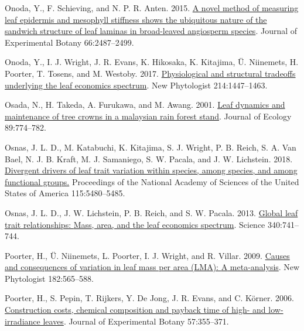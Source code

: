 \documentclass[
  12pt,
  a4paper,
,tablecaptionabove
]{scrartcl}
\newlength{\cslhangindent}
\newenvironment{CSLReferences}[2] %
 {%
  \setlength{\parindent}{0pt}
  \ifodd #1 \everypar{\setlength{\hangindent}{\cslhangindent}}\ignorespaces\fi
  \ifnum #2 > 0
  \setlength{\parskip}{#2\baselineskip}
  \fi
 }%
 {}
\begin{document}
\begin{CSLReferences}{1}{0}
\leavevmode{}%
Onoda, Y., F. Schieving, and N. P. R. Anten. 2015.
\href{https://doi.org/10.1093/jxb/erv024}{A novel method of measuring
leaf epidermis and mesophyll stiffness shows the ubiquitous nature of
the sandwich structure of leaf laminas in broad-leaved angiosperm
species}. Journal of Experimental Botany 66:2487--2499.

\leavevmode{}%
Onoda, Y., I. J. Wright, J. R. Evans, K. Hikosaka, K. Kitajima, Ü.
Niinemets, H. Poorter, T. Tosens, and M. Westoby. 2017.
\href{https://doi.org/10.1111/nph.14496}{Physiological and structural
tradeoffs underlying the leaf economics spectrum}. New Phytologist
214:1447--1463.

\leavevmode{}%
Osada, N., H. Takeda, A. Furukawa, and M. Awang. 2001.
\href{https://doi.org/10.1046/j.0022-0477.2001.00590.x}{Leaf dynamics
and maintenance of tree crowns in a malaysian rain forest stand}.
Journal of Ecology 89:774--782.

\leavevmode{}%
Osnas, J. L. D., M. Katabuchi, K. Kitajima, S. J. Wright, P. B. Reich,
S. A. Van Bael, N. J. B. Kraft, M. J. Samaniego, S. W. Pacala, and J. W.
Lichstein. 2018.
\href{https://doi.org/10.1073/pnas.1803989115}{Divergent drivers of leaf
trait variation within species, among species, and among functional
groups.} Proceedings of the National Academy of Sciences of the United
States of America 115:5480--5485.

\leavevmode{}%
Osnas, J. L. D., J. W. Lichstein, P. B. Reich, and S. W. Pacala. 2013.
\href{https://doi.org/10.1126/science.1231574}{Global leaf trait
relationships: {Mass}, area, and the leaf economics spectrum}. Science
340:741--744.

\leavevmode{}%
Poorter, H., Ü. Niinemets, L. Poorter, I. J. Wright, and R. Villar.
2009. \href{https://doi.org/10.1111/j.1469-8137.2009.02830.x}{Causes and
consequences of variation in leaf mass per area ({LMA}): {A}
meta-analysis}. New Phytologist 182:565--588.

\leavevmode{}%
Poorter, H., S. Pepin, T. Rijkers, Y. De Jong, J. R. Evans, and C.
Körner. 2006. \href{https://doi.org/10.1093/jxb/erj002}{Construction
costs, chemical composition and payback time of high- and low-irradiance
leaves}. Journal of Experimental Botany 57:355--371.


\end{CSLReferences}
\end{document}
